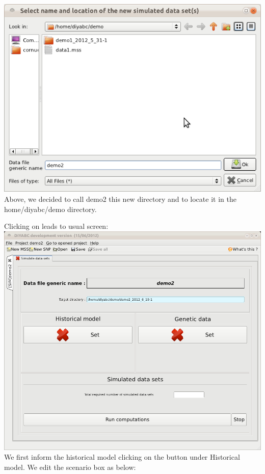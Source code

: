 \includegraphics[scale=0.33]{gui_pictures/Capture-DIYABC-64.png} \\

Above, we decided to call \textsf{demo2} this new directory and to locate it in the \textsf{home/diyabc/demo} directory.

Clicking on  leads to usual screen:\\

\includegraphics[scale=0.33]{gui_pictures/Capture-DIYABC-65.png} \\

We first inform the historical model clicking on the   button under \textsf{Historical model}. We edit the scenario box as below:\\

